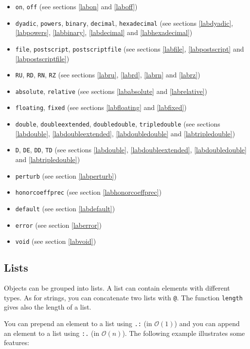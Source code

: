 \documentclass[a4paper]{article}
\newcommand{\com}[1]{\texttt{#1}}
\begin{document}
\begin{itemize}
\item \com{on}, \com{off} (see sections \ref{labon} and \ref{laboff})
\item \com{dyadic}, \com{powers}, \com{binary}, \com{decimal}, \com{hexadecimal} (see sections \ref{labdyadic}, \ref{labpowers}, \ref{labbinary}, \ref{labdecimal} and \ref{labhexadecimal})
\item \com{file}, \com{postscript}, \com{postscriptfile} (see sections \ref{labfile}, \ref{labpostscript} and \ref{labpostscriptfile})
\item \com{RU}, \com{RD}, \com{RN}, \com{RZ} (see sections \ref{labru}, \ref{labrd}, \ref{labrn} and \ref{labrz})
\item \com{absolute}, \com{relative} (see sections \ref{lababsolute} and \ref{labrelative})
\item \com{floating}, \com{fixed} (see sections \ref{labfloating} and \ref{labfixed})
\item \com{double}, \com{doubleextended}, \com{doubledouble}, \com{tripledouble} (see sections \ref{labdouble}, \ref{labdoubleextended}, \ref{labdoubledouble} and \ref{labtripledouble})
\item \com{D}, \com{DE}, \com{DD}, \com{TD} (see sections \ref{labdouble}, \ref{labdoubleextended}, \ref{labdoubledouble} and \ref{labtripledouble})
\item \com{perturb} (see section \ref{labperturb})
\item \com{honorcoeffprec} (see section \ref{labhonorcoeffprec})
\item \com{default} (see section \ref{labdefault})
\item \com{error} (see section \ref{laberror})
\item \com{void} (see section \ref{labvoid})
\end{itemize}

\subsection{Lists}
Objects can be grouped into lists. A list can contain elements with different types. As for strings, you can concatenate two lists with \com{@}. The function \com{length} gives also the length of a list.

You can prepend an element to a list using \com{.:} (in $\mathcal{O}(1)$) and you can append an element to a list using \com{:.} (in $\mathcal{O}(n)$). The following example illustrates some features:
\end{document}
